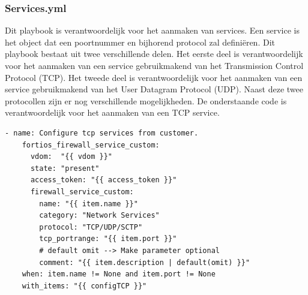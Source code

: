 \subsubsection{Services.yml}
\label{subsub:services.ym}
Dit playbook is verantwoordelijk voor het aanmaken van services. Een service is het object dat een poortnummer en bijhorend protocol zal definiëren. Dit playbook bestaat uit twee verschillende delen. Het eerste deel is verantwoordelijk voor het aanmaken van een service gebruikmakend van het Transmission Control Protocol (TCP). Het tweede deel is verantwoordelijk voor het aanmaken van een service gebruikmakend van het User Datagram Protocol (UDP). Naast deze twee protocollen zijn er nog verschillende mogelijkheden. De onderstaande code is verantwoordelijk voor het aanmaken van een TCP service. 
\begin{lstlisting}[caption={Playbook services, task TCP}, label={lst:CodeTCP}]
  - name: Configure tcp services from customer.
    fortios_firewall_service_custom:
      vdom:  "{{ vdom }}"
      state: "present"
      access_token: "{{ access_token }}"
      firewall_service_custom:
        name: "{{ item.name }}"
        category: "Network Services"
        protocol: "TCP/UDP/SCTP"
        tcp_portrange: "{{ item.port }}" 
        # default omit --> Make parameter optional
        comment: "{{ item.description | default(omit) }}"
    when: item.name != None and item.port != None
    with_items: "{{ configTCP }}"
\end{lstlisting}
